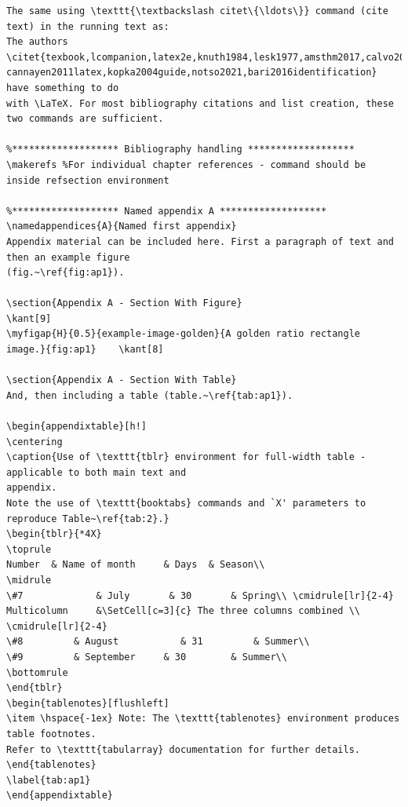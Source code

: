 \documentclass[letterpaper]{refart}
\begin{document}
{\begin{verbatim}
The same using \texttt{\textbackslash citet\{\ldots\}} command (cite text) in the running text as: 
The authors \citet{texbook,lcompanion,latex2e,knuth1984,lesk1977,amsthm2017,calvo2004using,
cannayen2011latex,kopka2004guide,notso2021,bari2016identification} have something to do 
with \LaTeX. For most bibliography citations and list creation, these two commands are sufficient.

%******************* Bibliography handling *******************
\makerefs %For individual chapter references - command should be inside refsection environment

%******************* Named appendix A *******************
\namedappendices{A}{Named first appendix}
Appendix material can be included here. First a paragraph of text and then an example figure 
(fig.~\ref{fig:ap1}).

\section{Appendix A - Section With Figure}
\kant[9]
\myfigap{H}{0.5}{example-image-golden}{A golden ratio rectangle image.}{fig:ap1}	\kant[8]

\section{Appendix A - Section With Table}
And, then including a table (table.~\ref{tab:ap1}).

\begin{appendixtable}[h!]
\centering
\caption{Use of \texttt{tblr} environment for full-width table - applicable to both main text and 
appendix.  
Note the use of \texttt{booktabs} commands and `X' parameters to reproduce Table~\ref{tab:2}.}
\begin{tblr}{*4X}
\toprule
Number 	& Name of month 	& Days 	& Season\\
\midrule
\#7 			& July       & 30 		& Spring\\ \cmidrule[lr]{2-4}
Multicolumn 	&\SetCell[c=3]{c} The three columns combined \\ \cmidrule[lr]{2-4}
\#8 		& August 		   & 31 		& Summer\\
\#9 		& September 	& 30 		& Summer\\
\bottomrule
\end{tblr}
\begin{tablenotes}[flushleft]
\item \hspace{-1ex} Note: The \texttt{tablenotes} environment produces table footnotes.  
Refer to \texttt{tabularray} documentation for further details.  
\end{tablenotes}
\label{tab:ap1}
\end{appendixtable}


\end{verbatim}}
\end{document}
